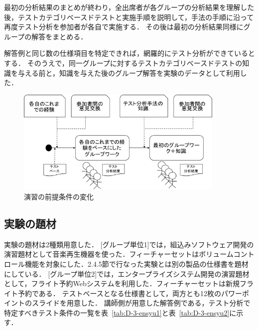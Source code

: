 最初の分析結果のまとめが終わり，全出席者が各グループの分析結果を理解した後，テストカテゴリベースドテストと実施手順を説明して，手法の手順に沿って再度テスト分析を参加者が各自で実施する．
その後は最初の分析結果同様にグループの解答をまとめる．

解答例と同じ数の仕様項目を特定できれば，網羅的にテスト分析ができているとする．
そのうえで，同一グループに対するテストカテゴリベースドテストの知識を与える前と，知識を与えた後のグループ解答を実験のデータとして利用した．
\begin{figure}[h]
\begin{center}
\includegraphics[width=10cm]{./image/D-3-ExparimentAbst1.png}
\caption{演習の前提条件の変化}
\label{fig:D-3-ExparimentAbst1}
\end{center}
\end{figure}

\subsection{実験の題材}
実験の題材は2種類用意した．
[グループ単位1]では，組込みソフトウェア開発の演習題材として音楽再生機器を使った．フィーチャーセットはボリュームコントロール機能を対象にした．2.4.5節で行なった実験とは別の製品の仕様書を題材にしている．
[グループ単位2]では，エンタープライズシステム開発の演習題材として，フライト予約Webシステムを利用した．フィーチャーセットは新規フライト予約である．
テストベースとなる仕様書として，両方とも12枚のパワーポイントのスライドを用意した．
講師側が用意した解答例である，テスト分析で特定すべきテスト条件の一覧を表~\ref{tab:D-3-ensyu1}と表~\ref{tab:D-3-ensyu2}に示す．

